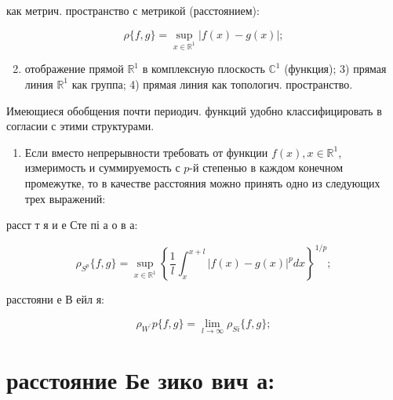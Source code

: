 \documentclass[10pt]{article}
\begin{document}
как метрич. пространство с метрикой (расстоянием):



\[

\rho\{f, g\}=\sup _{x \in \mathbb{R}^{1}}|f(x)-g(x)| ;

\]



\begin{enumerate}

  \setcounter{enumi}{1}

  \item отображение прямой $\mathbb{R}^{1}$ в комплексную плоскость $\mathbb{C}^{1}$ (функция); 3) прямая линия $\mathbb{R}^{1}$ как группа; 4) прямая линия как топологич. пространство.

\end{enumerate}



Имеющиеся обобщения почти периодич. функций удобно классифицировать в согласии с этими структурами.



\begin{enumerate}

  \item Если вместо непрерывности требовать от функции $f(x), x \in \mathbb{R}^{1}$, измеримость и суммируемость с $p$-й степенью в каждом конечном промежутке, то в качестве расстояния можно принять одно из следующих трех выражений:

\end{enumerate}



расст т я и е Сте пі а о в а:



\[

\rho_{S^{p}}\{f, g\}=\sup _{x \in \mathbb{R}^{1}}\left\{\frac{1}{l} \int_{x}^{x+l}|f(x)-g(x)|^{p} d x\right\}^{1 / p} ;

\]



расстояни $е$ В ейл я:



\[

\rho_{W^{\prime}} p\{f, g\}=\lim _{l \rightarrow \infty} \rho_{S i}\{f, g\} ;

\]



\section{расстояние Бе зико вич а:}
\end{document}
